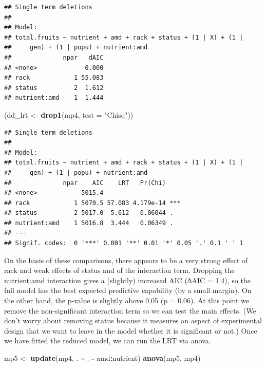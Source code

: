 \documentclass[
  12pt,
]{book}
\newenvironment{Shaded}{\begin{snugshade}}{\end{snugshade}}
\newcommand{\DataTypeTok}[1]{\textcolor[rgb]{0.13,0.29,0.53}{#1}}
\newcommand{\KeywordTok}[1]{\textcolor[rgb]{0.13,0.29,0.53}{\textbf{#1}}}
\newcommand{\NormalTok}[1]{#1}
\newcommand{\OperatorTok}[1]{\textcolor[rgb]{0.81,0.36,0.00}{\textbf{#1}}}
\newcommand{\StringTok}[1]{\textcolor[rgb]{0.31,0.60,0.02}{#1}}
\begin{document}
\begin{verbatim}
## Single term deletions
## 
## Model:
## total.fruits ~ nutrient + amd + rack + status + (1 | X) + (1 | 
##     gen) + (1 | popu) + nutrient:amd
##              npar   dAIC
## <none>             0.000
## rack            1 55.083
## status          2  1.612
## nutrient:amd    1  1.444
\end{verbatim}

\begin{Shaded}
\begin{Highlighting}[]
\NormalTok{(dd\_lrt \textless{}{-}}\StringTok{ }\KeywordTok{drop1}\NormalTok{(mp4, }\DataTypeTok{test =} \StringTok{"Chisq"}\NormalTok{))}
\end{Highlighting}
\end{Shaded}

\begin{verbatim}
## Single term deletions
## 
## Model:
## total.fruits ~ nutrient + amd + rack + status + (1 | X) + (1 | 
##     gen) + (1 | popu) + nutrient:amd
##              npar    AIC    LRT   Pr(Chi)    
## <none>            5015.4                     
## rack            1 5070.5 57.083 4.179e-14 ***
## status          2 5017.0  5.612   0.06044 .  
## nutrient:amd    1 5016.8  3.444   0.06349 .  
## ---
## Signif. codes:  0 '***' 0.001 '**' 0.01 '*' 0.05 '.' 0.1 ' ' 1
\end{verbatim}

On the basis of these comparisons, there appears to be a very strong effect of rack and weak effects of status and of the interaction term. Dropping the nutrient:amd interaction gives a (slightly) increased AIC (∆AIC = 1.4), so the full model has the best expected predictive capability (by a small margin). On the other hand, the p-value is slightly above 0.05 (p = 0.06). At this point we remove the non-significant interaction term so we can test the main effects. (We don't worry about removing status because it measures an aspect of experimental design that we want to leave in the model whether it is significant or not.) Once we have fitted the reduced model, we can run the LRT via anova.

\begin{Shaded}
\begin{Highlighting}[]
\NormalTok{mp5 \textless{}{-}}\StringTok{ }\KeywordTok{update}\NormalTok{(mp4, . }\OperatorTok{\textasciitilde{}}\StringTok{ }\NormalTok{. }\OperatorTok{{-}}\StringTok{ }\NormalTok{amd}\OperatorTok{:}\NormalTok{nutrient)}
\KeywordTok{anova}\NormalTok{(mp5, mp4)}
\end{Highlighting}
\end{Shaded}
\end{document}
